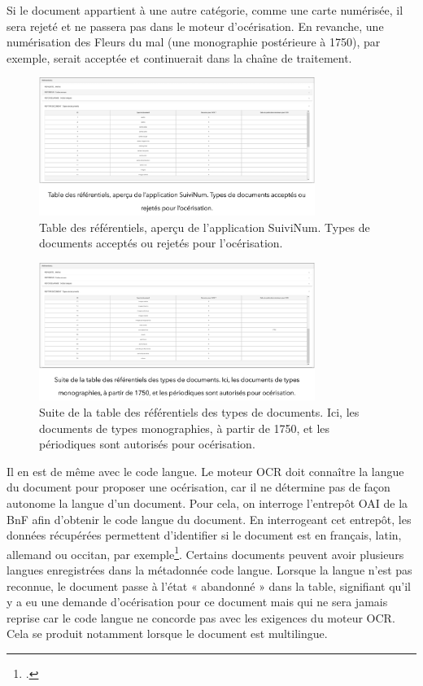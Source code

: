 \documentclass[a4paper,12pt,twoside]{book}
\begin{document}
	Si le document appartient à une autre catégorie, comme une carte numérisée, il sera rejeté et ne passera pas dans le moteur d'océrisation. En revanche, une numérisation des Fleurs du mal (une monographie postérieure à 1750), par exemple, serait acceptée et continuerait dans la chaîne de traitement.
	\\
	\begin{figure}[h!]
		\centering
		\includegraphics[width=0.8\textwidth]{images/ref_table_a.png}
		\caption{Table des référentiels, aperçu de l’application SuiviNum. Types de documents acceptés ou rejetés pour l’océrisation. }
		\label{fig:monimage}
	\end{figure}
	
	\begin{figure}[h!]
		\centering
		\includegraphics[width=0.8\textwidth]{images/ref_table_b.png}
		\caption{Suite de la table des référentiels des types de documents. Ici, les documents de types monographies, à partir de 1750, et les périodiques sont autorisés pour océrisation.}
		\label{fig:monimage}
	\end{figure}
	
	Il en est de même avec le code langue. Le moteur OCR doit connaître la langue du document pour proposer une océrisation, car il ne détermine pas de façon autonome la langue d’un document. Pour cela, on interroge l’entrepôt OAI de la BnF afin d’obtenir le code langue du document. En interrogeant cet entrepôt, les données récupérées permettent d'identifier si le document est en français, latin, allemand ou occitan, par exemple\footcite{de_lavenne_de_la_montoise_oai-pmh_2020}. Certains documents peuvent avoir plusieurs langues enregistrées dans la métadonnée code langue. Lorsque la langue n’est pas reconnue, le document passe à l’état « abandonné » dans la table, signifiant qu'il y a eu une demande d’océrisation pour ce document mais qui ne sera jamais reprise car le code langue ne concorde pas avec les exigences du moteur OCR. Cela se produit notamment lorsque le document est multilingue.
	
\end{document}
